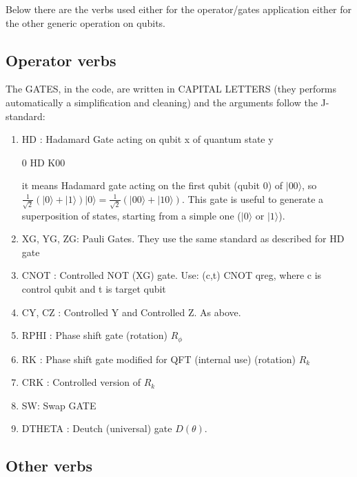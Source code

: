 \documentclass[a4paper,11pt]{amsbook}
\begin{document}
Below there are the verbs used either for the operator/gates application either for the other generic operation on qubits.

\subsection{Operator verbs}

The GATES, in the code, are written in CAPITAL LETTERS (they performs automatically a simplification and cleaning) and the arguments follow the J-standard:
\begin{enumerate}
\item HD : Hadamard Gate acting on qubit x of quantum state y
\begin{center}
 0 HD K00
\end{center}
it means Hadamard gate acting on the first qubit (qubit 0) of $|00\rangle$, so $\frac{1}{\sqrt{2}}(|0\rangle  + |1\rangle )|0\rangle  = \frac{1}{\sqrt{2}}(|00\rangle  + |10\rangle )$. This gate is useful to generate a superposition of states, starting from a simple one ($|0\rangle$ or $|1\rangle$).
\item XG, YG, ZG: Pauli Gates. They use the same standard as described for HD gate
\item CNOT : Controlled NOT (XG) gate. Use: (c,t) CNOT qreg, where c is control qubit and t is target qubit
\item CY, CZ : Controlled Y and Controlled Z. As above.
\item RPHI : Phase shift gate (rotation) $R_\phi$
\item RK : Phase shift gate modified for QFT (internal use) (rotation) $R_k$
\item CRK : Controlled version of $R_k$
\item SW: Swap GATE
\item DTHETA : Deutch (universal) gate $D(\theta)$.
\end{enumerate}

\subsection{Other verbs}
\end{document}
